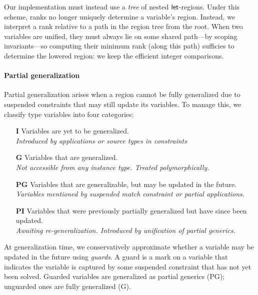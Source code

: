 \documentclass[acmsmall,screen,nonacm,review]{acmart}
\begin{document}
Our implementation must instead use a \emph{tree} of nested
$\mathopen{}\mathrel{\mathsf{let}}$-regions. Under this scheme, ranks no longer uniquely determine
a variable's region. Instead, we interpret a rank relative to a path in the region tree from the root. When two variables are
unified, they must always lie on some shared path---by scoping
invariants---so computing their minimum rank (along this path)
sufficies to determine the lowered region: we keep the efficient integer comparisons.

\paragraph{Partial generalization}

Partial generalization arises when a region cannot be fully
generalized due to suspended constraints that may still update
its variables. To manage this, we classify type variables
into four categories:

\begin{itemize}
  \item[\textbf{I}] Variables are yet to be generalized. \\
    \emph{Introduced by applications or source types in constraints}

  \item[\textbf{G}] Variables that are generalized. \\
    \emph{Not accessible from any instance type. Treated polymorphically.}

  \item[\textbf{PG}] Variables that are generalizable, but may be
    updated in the future. \\
    \emph{Variables mentioned by suspended match constraint or partial applications.}

  \item[\textbf{PI}] Variables that were previously partially generalized
    but have since been updated.  \\
    \emph{Awaiting re-generalization. Introduced by unification of partial generics.}
\end{itemize}

At generalization time, we conservatively approximate whether a variable may be
updated in the future using \emph{guards}. A guard is a mark on a variable that
indicates the variable is captured by some suspended constraint that has not
yet been solved. Guarded variables are generalized as partial generics (PG);
unguarded ones are fully generalized (G).
\end{document}
